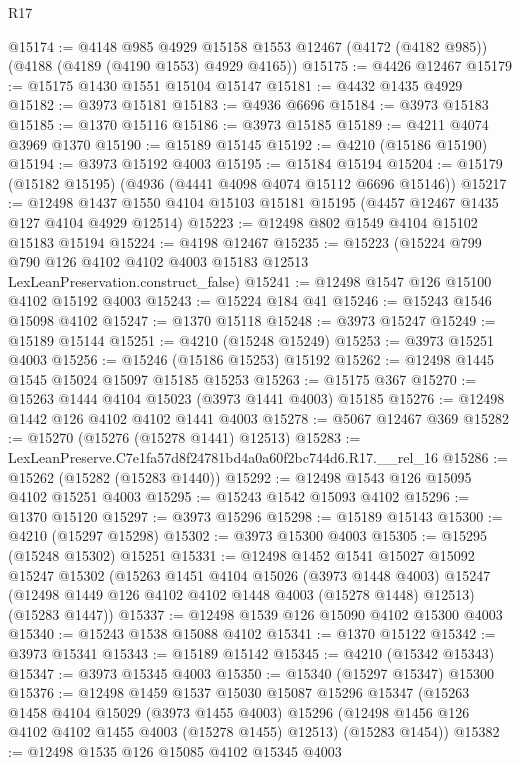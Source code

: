 \begin{lexlean}{R17}
\begin{coremodule}
@15174 := @4148
    @985
    @4929
    @15158
    @1553
    @12467
    (@4172 (@4182 @985))
    (@4188 (@4189 (@4190 @1553) @4929 @4165))
@15175 := @4426 @12467
@15179 := @15175 @1430 @1551 @15104 @15147
@15181 := @4432 @1435 @4929
@15182 := @3973 @15181
@15183 := @4936 @6696
@15184 := @3973 @15183
@15185 := @1370 @15116
@15186 := @3973 @15185
@15189 := @4211 @4074 @3969 @1370
@15190 := @15189 @15145
@15192 := @4210 (@15186 @15190)
@15194 := @3973 @15192 @4003
@15195 := @15184 @15194
@15204 := @15179 (@15182 @15195) (@4936 (@4441 @4098 @4074 @15112 @6696 @15146))
@15217 := @12498 @1437 @1550 @4104 @15103 @15181 @15195 (@4457 @12467 @1435 @127 @4104 @4929 @12514)
@15223 := @12498 @802 @1549 @4104 @15102 @15183 @15194
@15224 := @4198 @12467
@15235 := @15223
    (@15224 @799 @790 @126 @4102 @4102 @4003 @15183 @12513 LexLeanPreservation.construct_false)
@15241 := @12498 @1547 @126 @15100 @4102 @15192 @4003
@15243 := @15224 @184 @41
@15246 := @15243 @1546 @15098 @4102
@15247 := @1370 @15118
@15248 := @3973 @15247
@15249 := @15189 @15144
@15251 := @4210 (@15248 @15249)
@15253 := @3973 @15251 @4003
@15256 := @15246 (@15186 @15253) @15192
@15262 := @12498 @1445 @1545 @15024 @15097 @15185 @15253
@15263 := @15175 @367
@15270 := @15263 @1444 @4104 @15023 (@3973 @1441 @4003) @15185
@15276 := @12498 @1442 @126 @4102 @4102 @1441 @4003
@15278 := @5067 @12467 @369
@15282 := @15270 (@15276 (@15278 @1441) @12513)
@15283 := LexLeanPreserve.C7e1fa57d8f24781bd4a0a60f2bc744d6.R17.__rel_16
@15286 := @15262 (@15282 (@15283 @1440))
@15292 := @12498 @1543 @126 @15095 @4102 @15251 @4003
@15295 := @15243 @1542 @15093 @4102
@15296 := @1370 @15120
@15297 := @3973 @15296
@15298 := @15189 @15143
@15300 := @4210 (@15297 @15298)
@15302 := @3973 @15300 @4003
@15305 := @15295 (@15248 @15302) @15251
@15331 := @12498
    @1452
    @1541
    @15027
    @15092
    @15247
    @15302
    (@15263
      @1451
      @4104
      @15026
      (@3973 @1448 @4003)
      @15247
      (@12498 @1449 @126 @4102 @4102 @1448 @4003 (@15278 @1448) @12513)
      (@15283 @1447))
@15337 := @12498 @1539 @126 @15090 @4102 @15300 @4003
@15340 := @15243 @1538 @15088 @4102
@15341 := @1370 @15122
@15342 := @3973 @15341
@15343 := @15189 @15142
@15345 := @4210 (@15342 @15343)
@15347 := @3973 @15345 @4003
@15350 := @15340 (@15297 @15347) @15300
@15376 := @12498
    @1459
    @1537
    @15030
    @15087
    @15296
    @15347
    (@15263
      @1458
      @4104
      @15029
      (@3973 @1455 @4003)
      @15296
      (@12498 @1456 @126 @4102 @4102 @1455 @4003 (@15278 @1455) @12513)
      (@15283 @1454))
@15382 := @12498 @1535 @126 @15085 @4102 @15345 @4003

\end{coremodule}
\end{lexlean}
